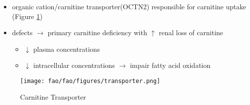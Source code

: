 \documentclass{scrartcl}
\begin{document}
\begin{enumerate}
\begin{enumerate}
\label{sec:org39430b0}
\begin{itemize}
\item organic cation/carnitine transporter(OCTN2) responsible for
carnitine uptake (Figure \ref{fig:org0678fee})
\item defects \(\to\) primary carnitine deficiency with \(\uparrow\) renal loss of carnitine
\begin{itemize}
\item \(\downarrow\) plasma concentrations
\item \(\downarrow\) intracellular concentrations \(\to\) impair fatty acid
oxidation
\end{itemize}
\end{itemize}

\begin{figure}[htbp]
\centering
\texttt{[image: fao/fao/figures/transporter.png]}
\caption{\label{fig:org0678fee}Carnitine Transporter}
\end{figure}


\end{enumerate}
\end{enumerate}
\end{document}
